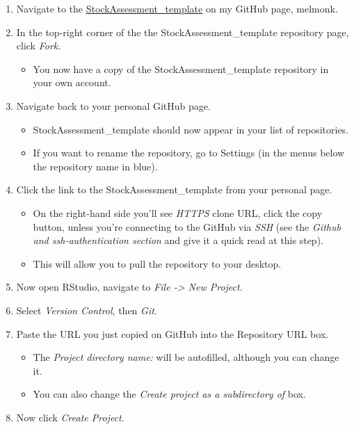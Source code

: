 \documentclass[12pt,]{article}
\providecommand{\tightlist}{%
  \setlength{\itemsep}{0pt}\setlength{\parskip}{0pt}}
\begin{document}
\begin{enumerate}
\def\labelenumi{\arabic{enumi}.}
\tightlist
\item
  Navigate to the
  \href{https://github.com/melmonk/StockAssessment_template}{StockAssessment\_template}
  on my GitHub page, melmonk.
\item
  In the top-right corner of the the StockAssessment\_template
  repository page, click \emph{Fork}.

  \begin{itemize}
  \tightlist
  \item
    You now have a copy of the StockAssessment\_template repository in
    your own account.
  \end{itemize}
\item
  Navigate back to your personal GitHub page.

  \begin{itemize}
  \tightlist
  \item
    StockAssessment\_template should now appear in your list of
    repositories.
  \item
    If you want to rename the repository, go to Settings (in the menus
    below the repository name in blue).
  \end{itemize}
\item
  Click the link to the StockAssessment\_template from your personal
  page.

  \begin{itemize}
  \tightlist
  \item
    On the right-hand side you'll see \emph{HTTPS} clone URL, click the
    copy button, unless you're connecting to the GitHub via \emph{SSH}
    (see the \emph{Github and ssh-authentication section} and give it a
    quick read at this step).
  \item
    This will allow you to pull the repository to your desktop.
  \end{itemize}
\item
  Now open RStudio, navigate to \emph{File -\textgreater{} New Project}.
\item
  Select \emph{Version Control}, then \emph{Git}.
\item
  Paste the URL you just copied on GitHub into the Repository URL box.

  \begin{itemize}
  \tightlist
  \item
    The \emph{Project directory name:} will be autofilled, although you
    can change it.
  \item
    You can also change the \emph{Create project as a subdirectory of}
    box.
  \end{itemize}
\item
  Now click \emph{Create Project}.


\end{enumerate}
\end{document}
